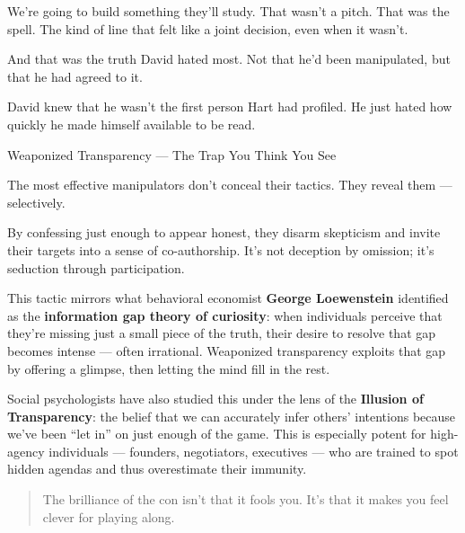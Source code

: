 We’re going to build something they’ll study.
That wasn’t a pitch. That was the spell.
The kind of line that felt like a joint decision, even when it wasn’t.

And that was the truth David hated most.
Not that he’d been manipulated, but that he had agreed to it.

David knew that he wasn’t the first person Hart had profiled.
He just hated how quickly he made himself available to be read.

\medskip

\begin{PsychologicalSidebar}{Weaponized Transparency — The Trap You Think You See}

    The most effective manipulators don’t conceal their tactics. They reveal them — selectively.

    
    \medskip
    
    By confessing just enough to appear honest, they disarm skepticism and invite their targets into a sense of 
    co-authorship. It’s not deception by omission; it’s seduction through participation.

    
    \medskip
    
    This tactic mirrors what behavioral economist \textbf{George Loewenstein} identified as the 
    \textbf{information gap theory of curiosity}: when individuals perceive that they’re missing 
    just a small piece of the truth, their desire to resolve that gap becomes intense — often irrational. 
    Weaponized transparency exploits that gap by offering a glimpse, then letting the mind fill in the rest.
    
    \medskip
    
    Social psychologists have also studied this under the lens of the \textbf{Illusion of Transparency}: 
    the belief that we can accurately infer others’ intentions because we've been “let in” on just enough of the game.  
    This is especially potent for high-agency individuals — founders, negotiators, executives — who are trained to 
    spot hidden agendas and thus overestimate their immunity.
    
    \begin{quote}
    The brilliance of the con isn't that it fools you.  
    It's that it makes you feel clever for playing along.
    \end{quote}
    
\end{PsychologicalSidebar}
    






